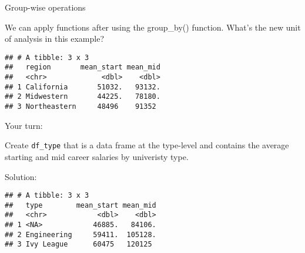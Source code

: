 \documentclass[ignorenonframetext,]{beamer}
\newenvironment{Shaded}{\begin{snugshade}}{\end{snugshade}}
\newcommand{\KeywordTok}[1]{\textcolor[rgb]{0.13,0.29,0.53}{\textbf{#1}}}
\newcommand{\DataTypeTok}[1]{\textcolor[rgb]{0.13,0.29,0.53}{#1}}
\newcommand{\DecValTok}[1]{\textcolor[rgb]{0.00,0.00,0.81}{#1}}
\newcommand{\StringTok}[1]{\textcolor[rgb]{0.31,0.60,0.02}{#1}}
\newcommand{\OperatorTok}[1]{\textcolor[rgb]{0.81,0.36,0.00}{\textbf{#1}}}
\newcommand{\NormalTok}[1]{#1}
\begin{document}
\begin{frame}[fragile]{Group-wise operations}

We can apply functions after using the group\_by() function. What's the
new unit of analysis in this example?

\begin{Shaded}
\end{Shaded}

\begin{verbatim}
## # A tibble: 3 x 3
##   region       mean_start mean_mid
##   <chr>             <dbl>    <dbl>
## 1 California       51032.   93132.
## 2 Midwestern       44225.   78180.
## 3 Northeastern     48496    91352
\end{verbatim}

\end{frame}

\begin{frame}[fragile]{Your turn:}

Create \texttt{df\_type} that is a data frame at the type-level and
contains the average starting and mid career salaries by univeristy
type.

\end{frame}

\begin{frame}[fragile]{Solution:}

\begin{Shaded}
\end{Shaded}

\begin{verbatim}
## # A tibble: 3 x 3
##   type        mean_start mean_mid
##   <chr>            <dbl>    <dbl>
## 1 <NA>            46885.   84106.
## 2 Engineering     59411.  105128.
## 3 Ivy League      60475   120125
\end{verbatim}

\end{frame}
\end{document}
